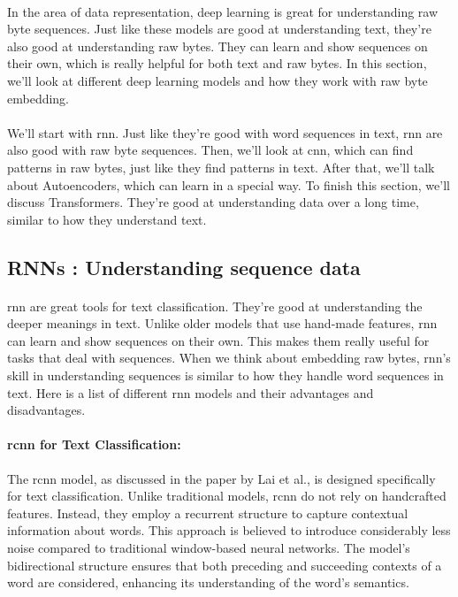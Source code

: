     \paragraph{}In the area of data representation, deep learning is great for understanding raw byte sequences. Just like these models are good at understanding text, they're also good at understanding raw bytes. They can learn and show sequences on their own, which is really helpful for both text and raw bytes. In this section, we'll look at different deep learning models and how they work with raw byte embedding.

    \paragraph{}We'll start with \acrfull{rnn}. Just like they're good with word sequences in text, \acrfull{rnn} are also good with raw byte sequences. Then, we'll look at \acrfull{cnn}, which can find patterns in raw bytes, just like they find patterns in text. After that, we'll talk about Autoencoders, which can learn in a special way. To finish this section, we'll discuss Transformers. They're good at understanding data over a long time, similar to how they understand text.

    \subsection{RNNs : Understanding sequence data}
        \paragraph{}\acrfull{rnn} are great tools for text classification. They're good at understanding the deeper meanings in text. Unlike older models that use hand-made features, \acrshort{rnn} can learn and show sequences on their own. This makes them really useful for tasks that deal with sequences. When we think about embedding raw bytes, \acrshort{rnn}'s skill in understanding sequences is similar to how they handle word sequences in text. Here is a list of different \acrshort{rnn} models and their advantages and disadvantages.

        \paragraph{\acrfull{rcnn} for Text Classification\cite{lai_recurrent_2015}:} The \acrshort{rcnn} model, as discussed in the paper by Lai et al., is designed specifically for text classification. Unlike traditional models, \acrshort{rcnn} do not rely on handcrafted features. Instead, they employ a recurrent structure to capture contextual information about words. This approach is believed to introduce considerably less noise compared to traditional window-based neural networks. The model's bidirectional structure ensures that both preceding and succeeding contexts of a word are considered, enhancing its understanding of the word's semantics.

